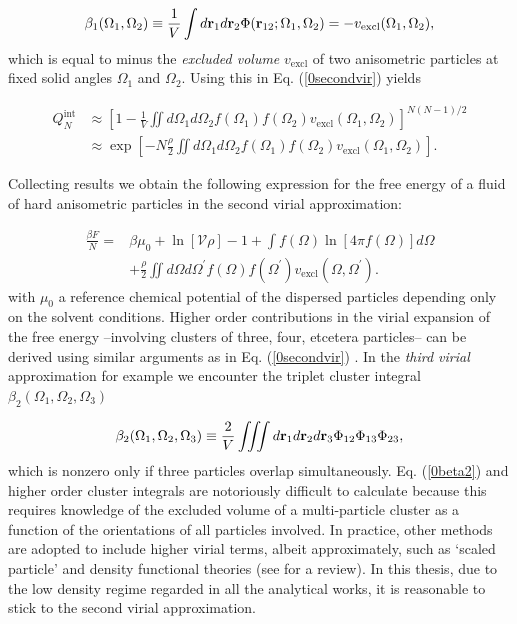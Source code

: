 {\begin{equation}
\beta_{1}(\Omega_{1},\Omega_{2})\equiv \frac{1}{V} \int d{\bf r}_{1}d {\bf r}_{2} \Phi({\bf r} _{12}; \Omega_{1}, \Omega_{2})=-v_{\text{excl}}(\Omega_{1},\Omega_{2}),
\label{0cluster}
\end{equation}
which is equal to minus the {\em excluded volume} $v_{\text{excl}}$ of two anisometric particles at fixed solid angles $\Omega_{1}$ and $\Omega_{2}$. Using this in Eq. (\ref{0secondvir}) yields

\begin{align}
Q_{N}^{\text{int}}&\approx \left[1-\frac{1}{V} \iint d\Omega_{1} d\Omega_{2}
f(\Omega_{1})f(\Omega_{2})v_{\text{excl}}(\Omega_{1},\Omega_{2})\right]^{N(N-1)/2} \nonumber \\
&\approx \exp\left[-N \frac{\rho}{2}  \iint d\Omega_{1} d\Omega_{2}
f(\Omega_{1})f(\Omega_{2})v_{\text{excl}}(\Omega_{1},\Omega_{2})  \right].
\end{align}

Collecting results we obtain the following expression for the free energy of a fluid of hard anisometric particles in the second virial approximation:

\begin{align}
\frac{\beta F}{N} =& \beta \mu_{0}+\ln\left[\mathcal{V}\rho\right]-1+
\int f(\Omega)\ln \left[4\pi f(\Omega)\right]d\Omega \nonumber \\
&+\frac{\rho}{2} \iint d\Omega d\Omega^{\prime}
f(\Omega)f(\Omega^{\prime})v_{\text{excl}}(\Omega,\Omega^{\prime}). \label{0freetot}
\end{align}
with $\mu_{0}$ a reference chemical potential of the dispersed particles depending only on the solvent conditions. Higher order contributions in the virial expansion of the free energy --involving clusters of three, four, etcetera particles-- can be derived using similar arguments as in Eq. (\ref{0secondvir}) \cite{vankampen}. In the {\em third virial} approximation for example we encounter the triplet cluster integral $\beta_{2}(\Omega_{1},\Omega_{2},\Omega_{3})$

\begin{equation}
\beta_{2}(\Omega_{1},\Omega_{2},\Omega_{3})\equiv \frac{2}{V}\iiint
d{\bf r}_{1}d{\bf r}_{2}d{\bf r}_{3} \Phi_{12}\Phi_{13}\Phi_{23}, \label{0beta2}
\end{equation}
which is nonzero only if three particles overlap simultaneously. Eq. (\ref{0beta2}) and higher order cluster integrals are notoriously difficult to calculate because this requires knowledge of the excluded volume of a multi-particle cluster as a function of the orientations of all particles involved. In practice, other methods are adopted to include higher virial terms, albeit approximately, such as `scaled particle' \cite{Cotterspt,Cotter} and density functional theories (see \cite{Vroege92,DFTspecialJPCM} for a review). In this thesis, due to the low density regime regarded in all the analytical works, it is reasonable to stick to the second virial approximation.

}
